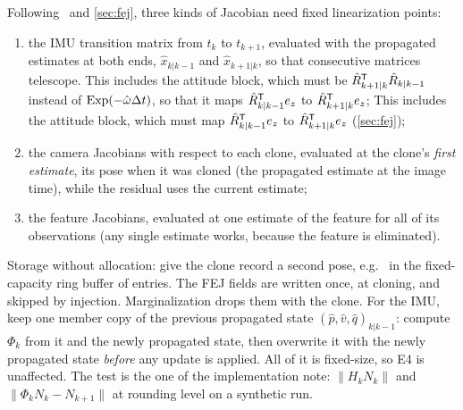 \begin{solutions}
  \item Following~\cite{li2013msckf2} and \cref{sec:fej}, three kinds of Jacobian need fixed linearization points:
        \begin{enumerate}[label=(\alph*)]
          \item the IMU transition matrix from $t_k$ to $t_{k+1}$, evaluated with the propagated estimates at both ends, $\hat x_{k|k-1}$ and $\hat x_{k+1|k}$, so that consecutive matrices telescope.
                \ifsolutions This includes the attitude block, which must be $\hat R_{k+1|k}^{\mathsf{T}}\hat R_{k|k-1}$ instead of $\operatorname{Exp}(-\hat\omega{\Delta t})$, so that it maps $\hat R_{k|k-1}^{\mathsf{T}} e_z$ to $\hat R_{k+1|k}^{\mathsf{T}} e_z$;
                \else This includes the attitude block, which must map $\hat R_{k|k-1}^{\mathsf{T}} e_z$ to $\hat R_{k+1|k}^{\mathsf{T}} e_z$ (\cref{sec:fej});\fi
          \item the camera Jacobians with respect to each clone, evaluated at the clone's \emph{first estimate}, its pose when it was cloned (the propagated estimate at the image
                time), while the residual uses the current estimate;
          \item the feature Jacobians, evaluated at one estimate of the feature for all of its observations (any single estimate works, because the feature is
                eliminated).
        \end{enumerate}
        Storage without allocation: give the clone record a second pose, e.g.\  in the
        fixed-capacity ring buffer of  entries. The FEJ fields are written once, at cloning, and skipped by injection. Marginalization drops them with the
        clone. For the IMU, keep one member copy of the previous propagated state $(\hat p, \hat v, \hat q)_{k|k-1}$: compute $\Phi_k$ from it and the newly propagated state, then
        overwrite it with the newly propagated state \emph{before} any update is applied. All of it is fixed-size, so E4 is unaffected. The test is the one of the
        implementation note: $\|H_kN_k\|$ and $\|\Phi_kN_k - N_{k+1}\|$ at rounding level on a synthetic run.
\end{solutions}
